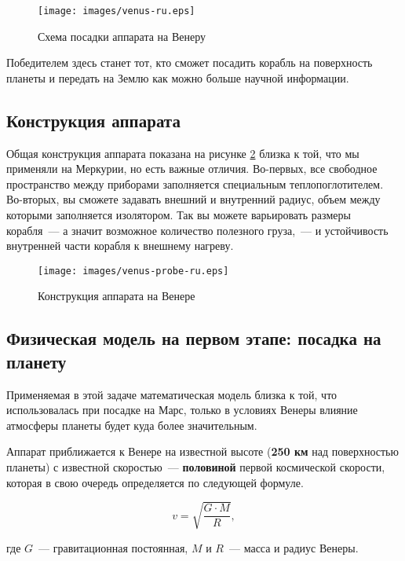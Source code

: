 \documentclass[12pt,a4paper]{article}
\begin{document}
\begin{figure}[tbh]
  \begin{center}
    \texttt{[image: images/venus-ru.eps]}
    \caption{Схема посадки аппарата на Венеру}
    \label{Pic:venus}
  \end{center}
\end{figure}

Победителем здесь станет тот, кто сможет посадить корабль на поверхность планеты и
передать на Землю как можно больше научной информации.

\subsection{Конструкция аппарата}

Общая конструкция аппарата показана на рисунке \ref{Pic:venus-probe} близка к той, что мы
применяли на Меркурии, но есть важные отличия. Во-первых, все свободное пространство между
приборами заполняется специальным теплопоглотителем. Во-вторых, вы сможете задавать
внешний и внутренний радиус, объем между которыми заполняется изолятором. Так вы можете
варьировать размеры корабля~--- а значит возможное количество полезного груза,~--- и
устойчивость внутренней части корабля к внешнему нагреву.

\begin{figure}[tbh]
  \begin{center}
    \texttt{[image: images/venus-probe-ru.eps]}
    \caption{Конструкция аппарата на Венере}
    \label{Pic:venus-probe}
  \end{center}
\end{figure}

\subsection{Физическая модель на первом этапе: посадка на планету}

Применяемая в этой задаче математическая модель близка к той, что использовалась при
посадке на Марс, только в условиях Венеры влияние атмосферы планеты будет куда более
значительным.

Аппарат приближается к Венере на известной высоте (\textbf{250 км} над поверхностью
планеты) с известной скоростью~--- \textbf{половиной} первой космической скорости, которая в свою
очередь определяется по следующей формуле.

$$
v = \sqrt{\frac{G \cdot M}{R}},
$$

где $G$~--- гравитационная постоянная, $M$ и $R$~--- масса и радиус Венеры.
\end{document}
